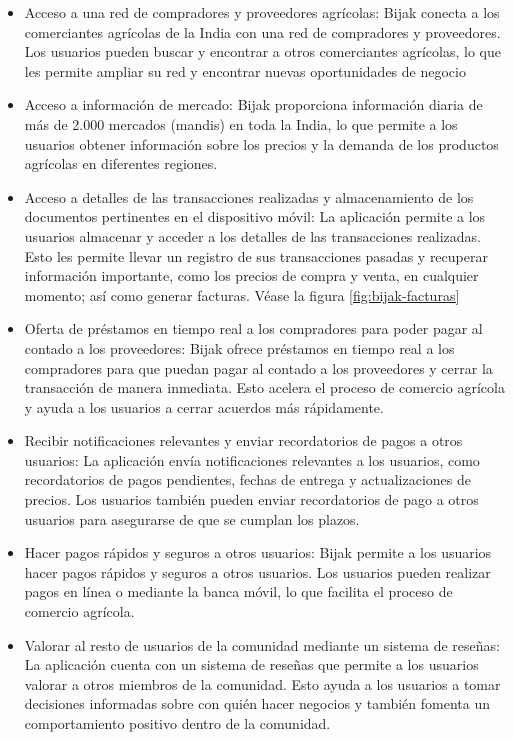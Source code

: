 \begin{itemize}

	\item Acceso a una red de compradores y proveedores agrícolas: Bijak conecta a los comerciantes agrícolas de la India con una red de compradores y proveedores. Los usuarios pueden buscar y encontrar a otros comerciantes agrícolas, lo que les permite ampliar su red y encontrar nuevas oportunidades de negocio

	\item Acceso a información de mercado: Bijak proporciona información diaria de más de 2.000 mercados (mandis) en toda la India, lo que permite a los usuarios obtener información sobre los precios y la demanda de los productos agrícolas en diferentes regiones.

	\item Acceso a detalles de las transacciones realizadas y almacenamiento de los documentos pertinentes en el dispositivo móvil: La aplicación permite a los usuarios almacenar y acceder a los detalles de las transacciones realizadas. Esto les permite llevar un registro de sus transacciones pasadas y recuperar información importante, como los precios de compra y venta, en cualquier momento; así como generar facturas. Véase la figura \ref{fig:bijak-facturas}

	\item Oferta de préstamos en tiempo real a los compradores para poder pagar al contado a los proveedores: Bijak ofrece préstamos en tiempo real a los compradores para que puedan pagar al contado a los proveedores y cerrar la transacción de manera inmediata. Esto acelera el proceso de comercio agrícola y ayuda a los usuarios a cerrar acuerdos más rápidamente.

	\item Recibir notificaciones relevantes y enviar recordatorios de pagos a otros usuarios: La aplicación envía notificaciones relevantes a los usuarios, como recordatorios de pagos pendientes, fechas de entrega y actualizaciones de precios. Los usuarios también pueden enviar recordatorios de pago a otros usuarios para asegurarse de que se cumplan los plazos.

	\item Hacer pagos rápidos y seguros a otros usuarios: Bijak permite a los usuarios hacer pagos rápidos y seguros a otros usuarios. Los usuarios pueden realizar pagos en línea o mediante la banca móvil, lo que facilita el proceso de comercio agrícola.

	\item Valorar al resto de usuarios de la comunidad mediante un sistema de reseñas: La aplicación cuenta con un sistema de reseñas que permite a los usuarios valorar a otros miembros de la comunidad. Esto ayuda a los usuarios a tomar decisiones informadas sobre con quién hacer negocios y también fomenta un comportamiento positivo dentro de la comunidad.

\end{itemize}

